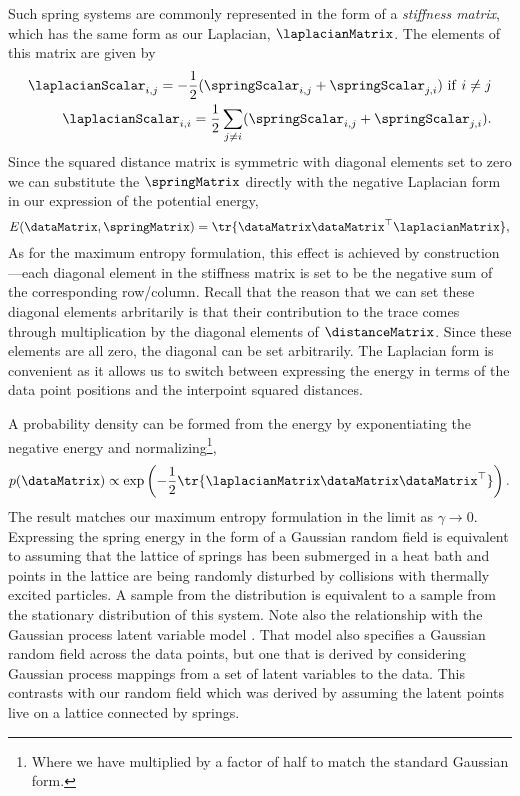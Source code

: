 Such spring systems are commonly represented in the form of a
\emph{stiffness matrix}, which has the same form as our Laplacian, $\laplacianMatrix$. The elements of this
matrix are given by
\begin{align}
  \laplacianScalar_{i,j}=-\frac{1}{2}(\springScalar_{i,j}+\springScalar_{j,
  i}) \,\,\mathrm{if}\,\,i\neq j \label{eqn:diagonalLaplacian}\\
\laplacianScalar_{i,i}=\frac{1}{2}\sum_{j\neq
  i} (\springScalar_{i,j} + \springScalar_{j,i}). \label{eqn:offdiagonalLaplacian}
\end{align}
Since the squared  distance matrix is  symmetric with  diagonal elements  set to
zero we can substitute  the $\springMatrix$ directly with the negative
Laplacian form in our expression of the potential energy,
\[
  E(\dataMatrix, \springMatrix) =\tr{\dataMatrix\dataMatrix^\top\laplacianMatrix},
\]
As for the maximum entropy formulation, this effect is achieved by
construction---each diagonal element in the stiffness matrix is set to
be the negative sum of the corresponding row/column.  Recall that the
reason that we can set these diagonal elements arbritarily is that
their contribution to the trace comes through multiplication by the
diagonal elements of $\distanceMatrix$. Since these elements are all
zero, the diagonal can be set arbitrarily.  The Laplacian form is
convenient as it allows us to switch between expressing the energy in
terms of the data point positions and the interpoint squared
distances.

A probability
density can be  formed from the energy by  exponentiating the negative
energy and  normalizing\footnote{Where we have multiplied  by a factor
  of half to match the standard Gaussian form.},
\[
p(\dataMatrix) \propto \exp\left(-\frac{1}{2}\tr{\laplacianMatrix
    \dataMatrix\dataMatrix^\top}\right).
\]
The result matches our maximum entropy formulation in the limit as
$\gamma\rightarrow 0$. Expressing the spring energy in the form of a
Gaussian random field is equivalent to assuming that the lattice of
springs has been submerged in a heat bath and points in the lattice
are being randomly disturbed by collisions with thermally excited
particles. A sample from the distribution is equivalent to a sample
from the stationary distribution of this system. Note also the
relationship with the Gaussian process latent variable model
\citep{Lawrence:pnpca05}. That model also specifies a Gaussian random
field across the data points, but one that is derived by considering
Gaussian process mappings from a set of latent variables to the
data. This contrasts with our random field which was derived by
assuming the latent points live on a lattice connected by springs.

